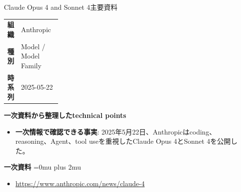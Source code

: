 \begin{technicalnote}{Claude Opus 4 and Sonnet 4}{主要資料}
\begingroup
\begin{tabularx}{\linewidth}{@{}>{\bfseries}p{0.22\linewidth}X@{}}
組織 & Anthropic \\
種別 & Model / Model Family \\
時系列 & 2025-05-22 \\
\end{tabularx}
\smallskip
\begin{minipage}{\linewidth}
{\bfseries 一次資料から整理したtechnical points}
\begin{itemize}[leftmargin=1.5em,itemsep=0.35em]
\item \textbf{一次情報で確認できる事実}: 2025年5月22日、Anthropicはcoding、reasoning、Agent、tool useを重視したClaude Opus 4とSonnet 4を公開した。
\end{itemize}
\begin{samepage}
{\bfseries 一次資料}
\begingroup\sloppy
\Urlmuskip=0mu plus 2mu\relax
\begin{itemize}[leftmargin=1.5em,itemsep=0.25em]
\item {\scriptsize\url{https://www.anthropic.com/news/claude-4}}
\end{itemize}
\endgroup
\end{samepage}
\end{minipage}
\endgroup
\end{technicalnote}
\medskip

